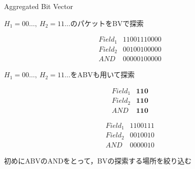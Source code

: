 \documentclass[12pt,dvipdfmx,mathserif,uplatex,aspectratio=32]{beamer}
\begin{document}
\begin{frame}{Aggregated Bit Vector}

\begin{block}{$H_{1} = 00 \dots, \ H_{2} = 11 \dots$のパケットをBVで探索}

\begin{equation*}
 \begin{array}{ll}
  Field_{1} & 11001110000 \\ 
  Field_{2} & 00100100000 \\ \hline
  AND      & 00000100000 
 \end{array}
\end{equation*}
\end{block}

\begin{block}{$H_{1} = 00 \dots , \ H_{2} = 11 \dots$をABVも用いて探索}
\vspace{-5mm}
\begin{figure}[h]
 \def\@captype{table}
 \begin{minipage}[t]{.45\textwidth}
\begin{equation*}
 \begin{array}{ll}
  Field_{1} & \mathbf{110} \\
  Field_{2} & \mathbf{110} \\ \hline
  AND      &  \mathbf{110}
 \end{array}
\end{equation*}

  \end{minipage}
  \hfill
  \begin{minipage}[t]{.45\textwidth}
\begin{equation*}
 \begin{array}{ll}
  Field_{1} & 1100111 \\
  Field_{2} & 0010010 \\ \hline
  AND      &  0000010
 \end{array}
\end{equation*}

  \end{minipage}
\end{figure}

初めにABVのANDをとって，BVの探索する場所を絞り込む

\end{block}
\end{frame}
\end{document}
